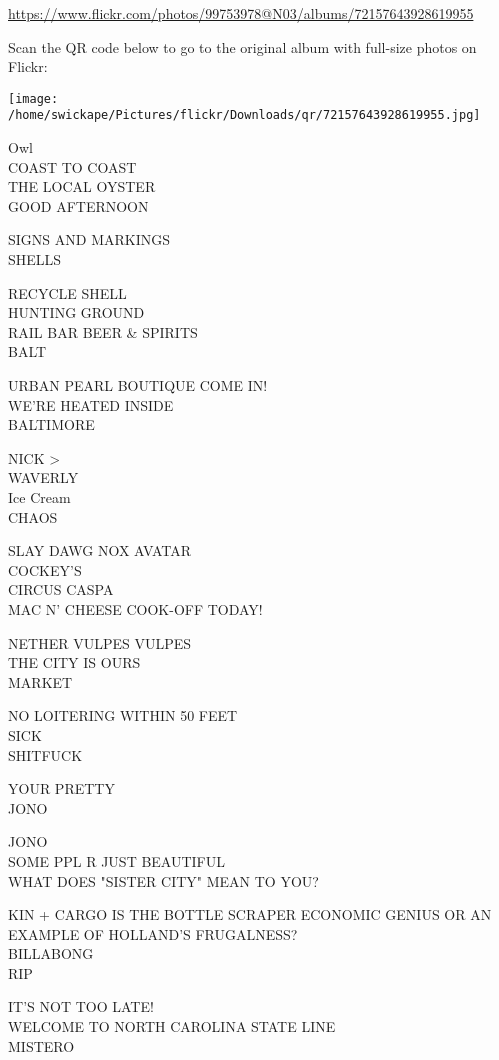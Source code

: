 \documentclass[10pt,letterpaper]{article}
\begin{document}
\url{https://www.flickr.com/photos/99753978@N03/albums/72157643928619955}

Scan the QR code below to go to the original album with full-size photos on Flickr:

\texttt{[image: /home/swickape/Pictures/flickr/Downloads/qr/72157643928619955.jpg]}
\pagebreak

Owl\\
COAST TO COAST\\
THE LOCAL OYSTER\\
GOOD AFTERNOON

SIGNS AND MARKINGS\\
SHELLS

RECYCLE SHELL\\
HUNTING GROUND\\
RAIL BAR BEER \& SPIRITS\\
BALT

URBAN PEARL BOUTIQUE COME IN!\\
WE'RE HEATED INSIDE\\
BALTIMORE

NICK >\\
WAVERLY\\
Ice Cream\\
CHAOS

SLAY DAWG NOX AVATAR\\
COCKEY'S\\
CIRCUS CASPA\\
MAC N' CHEESE COOK{-}OFF TODAY!

NETHER VULPES VULPES\\
THE CITY IS OURS\\
MARKET

NO LOITERING WITHIN 50 FEET\\
SICK\\
SHITFUCK

YOUR PRETTY\\
JONO

JONO\\
SOME PPL R JUST BEAUTIFUL\\
WHAT DOES "SISTER CITY" MEAN TO YOU?

KIN + CARGO IS THE BOTTLE SCRAPER ECONOMIC GENIUS OR AN EXAMPLE OF HOLLAND'S FRUGALNESS?\\
BILLABONG\\
RIP

IT'S NOT TOO LATE!\\
WELCOME TO NORTH CAROLINA STATE LINE\\
MISTERO
\end{document}
